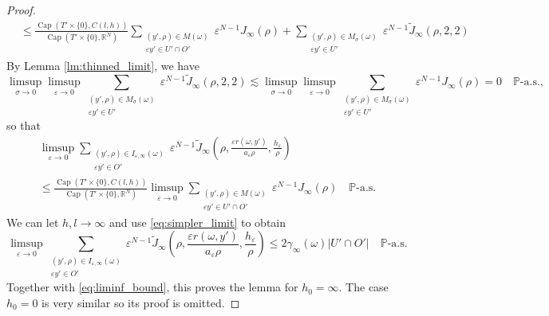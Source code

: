 \documentclass{article}
\numberwithin{equation}{section}
\theoremstyle{definition}
\theoremstyle{remark}
\newcommand{\cpct}{\operatorname{Cap}}
\begin{document}
\begin{proof}
\begin{equation}
\begin{aligned}
            &\le \frac{\cpct(T' \times \{0\}, C(l, h))}{\cpct(T' \times \{0\}, \mathbb{R}^N)} \sum \limits_{\substack{(y', \rho) \in M(\omega) \\ \varepsilon y' \in U' \cap O'}} \varepsilon^{N - 1} J_\infty(\rho) + \sum \limits_{\substack{(y', \rho) \in M_\sigma(\omega) \\ \varepsilon y' \in U'}} \varepsilon^{N - 1} \tilde{J}_\infty(\rho, 2, 2)
        \end{aligned}
    \end{equation}
    By Lemma \ref{lm:thinned_limit}, we have
    \[
    \limsup_{\sigma \to 0} \limsup_{\varepsilon \to 0} \sum \limits_{\substack{(y', \rho) \in M_\sigma(\omega) \\ \varepsilon y' \in U'}} \varepsilon^{N - 1} \tilde{J}_\infty(\rho, 2, 2) \lesssim \limsup_{\sigma \to 0} \limsup_{\varepsilon \to 0} \sum \limits_{\substack{(y', \rho) \in M_\sigma(\omega) \\ \varepsilon y' \in U'}} \varepsilon^{N - 1} J_\infty(\rho) = 0 \quad \mathbb{P}\text{-a.s.},
    \]
    so that
    \begin{multline}
        \limsup_{\varepsilon \to 0}\sum \limits_{\substack{(y', \rho) \in I_{\varepsilon, \infty}(\omega) \\ \varepsilon y' \in O'}} \varepsilon^{N - 1} \tilde{J}_\infty\left(\rho, \frac{\varepsilon r(\omega, y')}{a_\varepsilon \rho}, \frac{h_\varepsilon}{\rho}\right)  \\
        \le \frac{\cpct(T' \times \{0\}, C(l, h))}{\cpct(T' \times \{0\}, \mathbb{R}^N)} \limsup_{\varepsilon \to 0} \sum \limits_{\substack{(y', \rho) \in M(\omega) \\ \varepsilon y' \in U' \cap O'}} \varepsilon^{N - 1} J_\infty(\rho) \quad \mathbb{P}\text{-a.s.}
    \end{multline}
    We can let $h, l \to \infty$ and use \eqref{eq:simpler_limit} to obtain
    \[
    \limsup_{\varepsilon \to 0}\sum \limits_{\substack{(y', \rho) \in I_{\varepsilon, \infty}(\omega) \\ \varepsilon y' \in O'}} \varepsilon^{N - 1} \tilde{J}_\infty\left(\rho, \frac{\varepsilon r(\omega, y')}{a_\varepsilon \rho}, \frac{h_\varepsilon}{\rho}\right) \le 2 \gamma_\infty(\omega) |U' \cap O'| \quad \mathbb{P}\text{-a.s.}
    \]
    Together with \eqref{eq:liminf_bound}, this proves the lemma for $h_0 = \infty$. The case $h_0 = 0$ is very similar so its proof is omitted. 
    

\end{proof}
\end{document}
